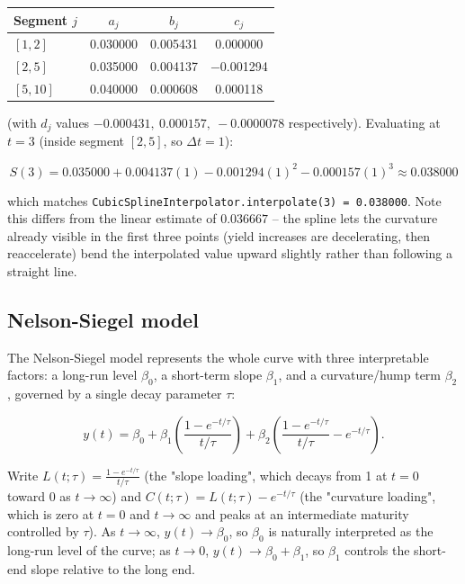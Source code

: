 \documentclass[11pt]{article}
\begin{document}
\begin{center}
\begin{tabular}{@{}lccc@{}}
\toprule
Segment $j$ & $a_j$ & $b_j$ & $c_j$ \\
\midrule
$[1,2]$  & 0.030000 & 0.005431 & 0.000000 \\
$[2,5]$  & 0.035000 & 0.004137 & $-$0.001294 \\
$[5,10]$ & 0.040000 & 0.000608 & 0.000118 \\
\bottomrule
\end{tabular}
\end{center}

(with $d_j$ values $-0.000431,\ 0.000157,\ -0.0000078$ respectively). Evaluating at $t=3$
(inside segment $[2,5]$, so $\Delta t = 1$):

\[
  S(3) = 0.035000 + 0.004137(1) - 0.001294(1)^2 - 0.000157(1)^3 \approx 0.038000
\]

which matches \texttt{CubicSplineInterpolator.interpolate(3) = 0.038000}. Note this differs
from the linear estimate of $0.036667$ -- the spline lets the curvature already visible in the
first three points (yield increases are decelerating, then reaccelerate) bend the interpolated
value upward slightly rather than following a straight line.

\subsection{Nelson-Siegel model}

The Nelson-Siegel model represents the whole curve with three interpretable factors: a
long-run level $\beta_0$, a short-term slope $\beta_1$, and a curvature/hump term $\beta_2$,
governed by a single decay parameter $\tau$:

\begin{equation}
  y(t) = \beta_0 + \beta_1 \left(\frac{1-e^{-t/\tau}}{t/\tau}\right)
              + \beta_2 \left(\frac{1-e^{-t/\tau}}{t/\tau} - e^{-t/\tau}\right).
  \label{eq:nelson-siegel}
\end{equation}

Write $L(t;\tau) = \frac{1-e^{-t/\tau}}{t/\tau}$ (the "slope loading", which decays from 1 at
$t=0$ toward 0 as $t \to \infty$) and $C(t;\tau) = L(t;\tau) - e^{-t/\tau}$ (the "curvature
loading", which is zero at $t=0$ and $t\to\infty$ and peaks at an intermediate maturity
controlled by $\tau$). As $t \to \infty$, $y(t) \to \beta_0$, so $\beta_0$ is naturally
interpreted as the long-run level of the curve; as $t \to 0$, $y(t) \to \beta_0 + \beta_1$, so
$\beta_1$ controls the short-end slope relative to the long end.
\end{document}
